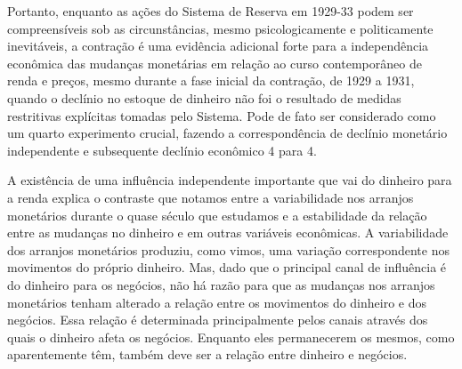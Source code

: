 \documentclass[a4paper,12pt]{article}[abntex2]
\begin{document}
Portanto, enquanto as ações do Sistema de Reserva em 1929-33 podem ser compreensíveis sob as circunstâncias, mesmo psicologicamente e politicamente inevitáveis, a contração é uma evidência adicional forte para a independência econômica das mudanças monetárias em relação ao curso contemporâneo de renda e preços, mesmo durante a fase inicial da contração, de 1929 a 1931, quando o declínio no estoque de dinheiro não foi o resultado de medidas restritivas explícitas tomadas pelo Sistema. Pode de fato ser considerado como um quarto experimento crucial, fazendo a correspondência de declínio monetário independente e subsequente declínio econômico 4 para 4.

A existência de uma influência independente importante que vai do dinheiro para a renda explica o contraste que notamos entre a variabilidade nos arranjos monetários durante o quase século que estudamos e a estabilidade da relação entre as mudanças no dinheiro e em outras variáveis econômicas. A variabilidade dos arranjos monetários produziu, como vimos, uma variação correspondente nos movimentos do próprio dinheiro. Mas, dado que o principal canal de influência é do dinheiro para os negócios, não há razão para que as mudanças nos arranjos monetários tenham alterado a relação entre os movimentos do dinheiro e dos negócios. Essa relação é determinada principalmente pelos canais através dos quais o dinheiro afeta os negócios. Enquanto eles permanecerem os mesmos, como aparentemente têm, também deve ser a relação entre dinheiro e negócios.
\end{document}
